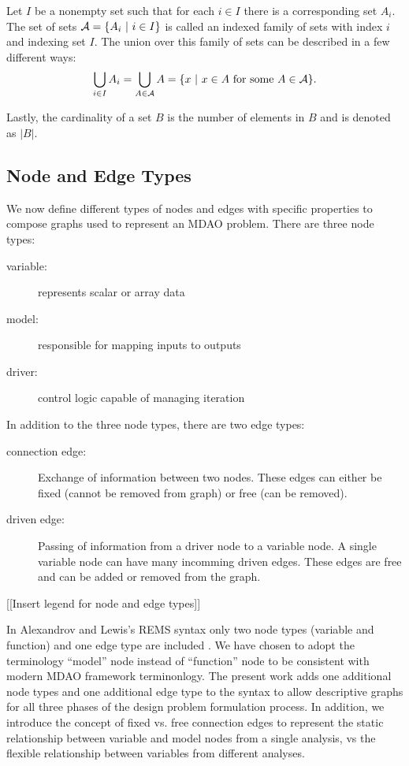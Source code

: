   Let $I$ be a nonempty set such that for each $i \in I$ there is a corresponding set $A_i$. 
  The set of sets $\mathcal A = \{A_i \ | \  i \in I\}$ is called an indexed family of sets with index $i$ and 
  indexing set $I$\cite{smith2006}. 
  The union over this family of sets can be described in a few different ways:
  \begin{equation}
  \bigcup_{i \in I} A_i = \bigcup_{A \in \mathcal A} A = \{x \ | \  x \in A \textrm{ for some } A \in \mathcal A\}.
  \end{equation}

  Lastly, the cardinality of a set $B$ is the number of elements in $B$ and is denoted as $|B|$.

\subsection{Node and Edge Types}
  \label{ss:types}
  We now define different types of nodes and edges with specific properties to compose graphs used to represent an MDAO problem. 
  There are three node types:  
  \begin{description}
    \item[variable:] represents scalar or array data
    \item[model:] responsible for mapping inputs to outputs
    \item[driver:] control logic capable of managing iteration
  \end{description}

  In addition to the three node types, there are two edge types: 

  \begin{description}
  \item[connection edge:] Exchange of information between two nodes. These edges 
  can either be fixed (cannot be removed from graph) or free (can be removed). 
  \item [driven edge:] Passing of information from a driver node to a 
    variable node. A single variable node can have many incomming driven edges. These edges are 
    free and can be added or removed from the graph. 
  \end{description}

  [[Insert legend for node and edge types]]

  In Alexandrov and Lewis's REMS syntax only two node types (variable and function) and one edge type are included \cite{alexandrov2004}. 
 We have chosen to adopt the terminology ``model'' node instead of ``function'' node to be consistent with modern MDAO framework terminonlogy. The present work 
  adds one additional node types and one additional edge type to the syntax to allow descriptive
  graphs for all three phases of the design problem formulation process. In addition, we introduce the 
  concept of fixed vs. free connection edges to represent the
  static relationship between variable and model nodes from a single analysis, 
  vs the flexible relationship between variables from different analyses. 

